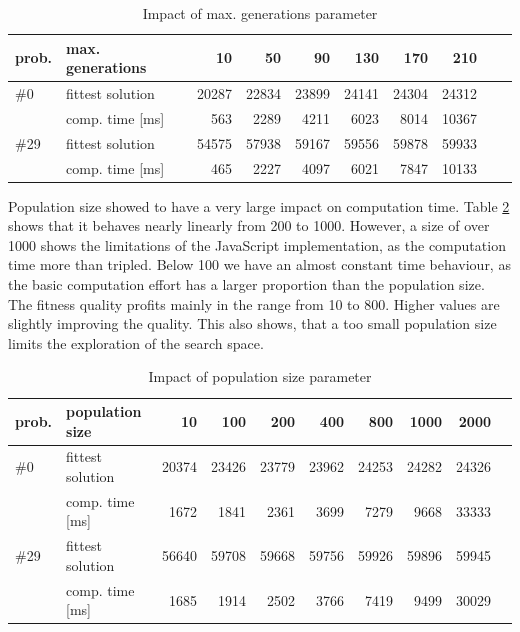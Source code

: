 \documentclass[a4paper]{article}
\begin{document}
\begin{table}[h t b p]
\begin{center}
\begin{tabular}{ l | l | r | r | r | r | r | r | r | r }
prob. & max. generations & 10 & 50 & 90 & 130 & 170 & 210 \\
\hline
\#0  & fittest solution	& 20287 & 22834 & 23899 & 24141 & 24304 & 24312 \\
& 	comp. time [ms]	  	& 563 & 2289 & 4211 & 6023 & 8014 & 10367 \\
\hline
\#29 & fittest solution	& 54575 & 57938 & 59167 & 59556 & 59878 & 59933 \\
& 	comp. time [ms]	  	& 465 & 2227 & 4097 & 6021 & 7847 & 10133 \\
\end{tabular}
\caption{Impact of max. generations parameter}
\label{tab:maxgen}
\end{center}
\end{table}

Population size showed to have a very large impact on computation time. Table \ref{tab:population} shows that it behaves nearly linearly from 200 to 1000. However, a size of over 1000 shows the limitations of the JavaScript implementation, as the computation time more than tripled. Below 100 we have an almost constant time behaviour, as the basic computation effort has a larger proportion than the population size. The fitness quality profits mainly in the range from 10 to 800. Higher values are slightly improving the quality. This also shows, that a too small population size limits the exploration of the search space.
   
\begin{table}[h t b p]
\begin{center}
\begin{tabular}{ l | l | r | r | r | r | r | r | r | r }
prob. & population size & 10 & 100 & 200 & 400 & 800 & 1000 & 2000 \\
\hline
\#0  & fittest solution	& 20374 & 23426 & 23779 & 23962 & 24253 & 24282 & 24326 \\
& 	comp. time [ms]	  	& 1672 & 1841 & 2361 & 3699 & 7279 & 9668 & 33333 \\
\hline
\#29 & fittest solution	& 56640 & 59708 & 59668 & 59756 & 59926 & 59896 & 59945 \\
& 	comp. time [ms]	  	& 1685 & 1914 & 2502 & 3766 & 7419 & 9499 & 30029 \\
\end{tabular}
\caption{Impact of population size parameter}
\label{tab:population}
\end{center}
\end{table}
\end{document}
